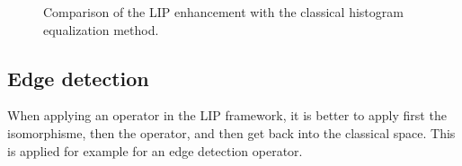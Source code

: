 \begin{figure}[htbp]
\centering\caption{Comparison of the LIP enhancement with the classical histogram equalization method.}%
  \hspace{.5cm}
 \hspace{.5cm}
 \vspace*{-3mm}%
 \label{lippython:fig:enhancement}%
\end{figure}

\subsection{Edge detection}
When applying an operator in the LIP framework, it is better to apply first the
isomorphisme, then the operator, and then get back into the classical space. This
is applied for example for an edge detection operator.


